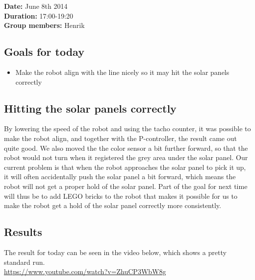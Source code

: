\textbf{Date:} June 8th 2014\\\textbf{Duration:}
17:00-19:20\\\textbf{Group members:} Henrik

\subsection{Goals for today}

\begin{itemize}
\itemsep1pt\parskip0pt
\item
  Make the robot align with the line nicely so it may hit the solar
  panels correctly
\end{itemize}

\subsection{Hitting the solar panels correctly}

By lowering the speed of the robot and using the tacho counter, it was
possible to make the robot align, and together with the P-controller,
the result came out quite good. We also moved the the color sensor a bit
further forward, so that the robot would not turn when it registered the
grey area under the solar panel. Our current problem is that when the
robot approaches the solar panel to pick it up, it will often
accidentally push the solar panel a bit forward, which means the robot
will not get a proper hold of the solar panel. Part of the goal for next
time will thus be to add LEGO bricks to the robot that makes it possible for us
to make the robot get a hold of the solar panel correctly more
consistently.

\subsection{Results}

The result for today can be seen in the video below, which shows a
pretty standard run.\\ \url{https://www.youtube.com/watch?v=ZhuCP3WbW8g}
